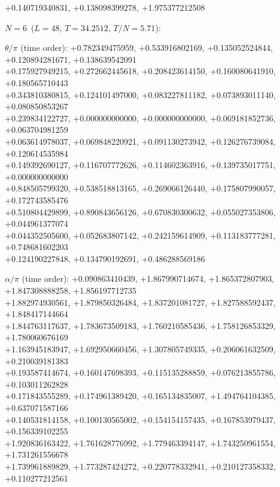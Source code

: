 \begin{flushleft}
+0.140719340831, +0.138098399278, +1.975377212508
\vspace{3pt}\par\noindent\textbf{$N=6$}\ ($L=48$, $T=34.2512$, $T/N=5.71$):
\par\noindent$\theta/\pi$ (time order):
+0.782349475959, +0.533916802169, +0.135052524844, +0.120894281671, +0.138639542091 \\
+0.175927949215, +0.272662445618, +0.208423614150, +0.160080641910, +0.180565710443 \\
+0.343810380815, +0.124101497000, +0.083227811182, +0.073893011140, +0.080850853267 \\
+0.239834122727, +0.000000000000, +0.000000000000, +0.069181852736, +0.063704981259 \\
+0.063614978037, +0.069848220921, +0.091130273942, +0.126276739084, +0.120614535984 \\
+0.149392690127, +0.116707772626, +0.114602363916, +0.139735017751, +0.000000000000 \\
+0.848505799320, +0.538518813165, +0.269066126440, +0.175807990057, +0.172743585476 \\
+0.510804429899, +0.890843656126, +0.670830300632, +0.055027353806, +0.044961377074 \\
+0.044352505600, +0.052683807142, +0.242159614909, +0.113183777281, +0.748681602203 \\
+0.124190227848, +0.134790192691, +0.486288569186
\par\noindent$\alpha/\pi$ (time order):
+0.090863410439, +1.867990714674, +1.865372807903, +1.847308888258, +1.856197712735 \\
+1.882974930561, +1.879850326484, +1.837201081727, +1.827588592437, +1.848417144664 \\
+1.844763117637, +1.783673509183, +1.760210585436, +1.758126853329, +1.780060676169 \\
+1.163945183947, +1.692950660456, +1.307805749335, +0.206061632509, +0.210039181383 \\
+0.193587414674, +0.160147698393, +0.115135288859, +0.076213855786, +0.103011262828 \\
+0.171843555289, +0.174961389420, +0.165134835007, +1.494764104385, +0.637071587166 \\
+0.140531814158, +0.100130565002, +0.154154157435, +0.167853979437, +0.156339102255 \\
+1.920836163422, +1.761628776992, +1.779463394147, +1.743250961554, +1.731261556678 \\
+1.739961889829, +1.773287424272, +0.220778332941, +0.210127358332, +0.110277212561 \\

\end{flushleft}
